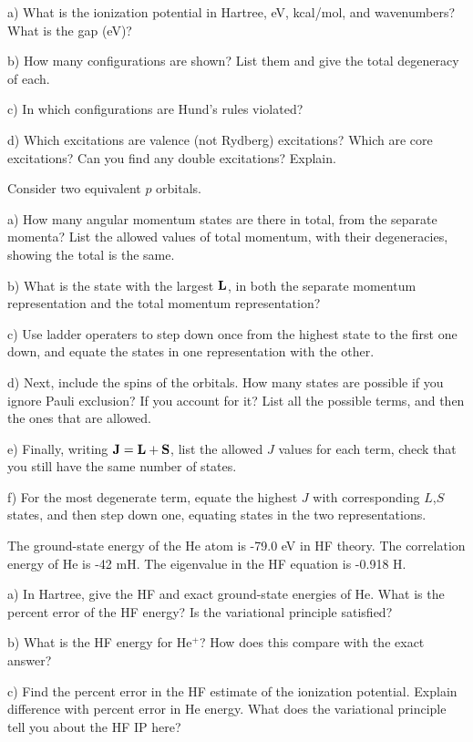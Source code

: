 a) What is the ionization potential in Hartree, eV, kcal/mol, and wavenumbers?
What is the gap (eV)?

b) How many configurations are shown?  List them and give the total degeneracy of each.

c) In which configurations are Hund's rules violated?

d) Which excitations are valence (not Rydberg) excitations?  Which are core excitations?
Can you find any double excitations?  Explain.

\newpage
{}

Consider two equivalent $p$ orbitals.

a) How many angular momentum states are there in total, from the separate
momenta?  List the allowed
values of total momentum, with their degeneracies, showing the total is the same.

b) What is the state with the largest ${\bf L}$, in both the separate momentum representation
and the total momentum representation?

c) Use ladder operaters to step down once from the highest state to the first one down,
and equate the states in one representation with the other.

d) Next, include the spins of the orbitals.   How many states are possible if you
ignore Pauli exclusion?  If you account for it?  List all the possible terms, and
then the ones that are allowed.

\def\bJ{{\bf J}}
\def\bS{{\bf S}}
e) Finally, writing $\bJ=\bL+\bS$, list the allowed $J$ values for each term, check that you still
have the same number of states.

f) For the most degenerate term, equate the highest $J$ with corresponding $L$,$S$ states, and then step down one,
equating states in the two representations.
\newpage
{}

The ground-state energy of the He atom is -79.0 eV in HF theory.  The
correlation energy of He is -42 mH.  The eigenvalue in the HF equation
is -0.918 H.

a) In Hartree, give the HF and exact ground-state energies of He.  What
is the percent error of the HF energy?  Is the variational principle satisfied?

b) What is the HF energy for He$^+$?  How does this compare with the exact answer?

c) Find the percent error in the HF estimate of the ionization potential.  Explain
difference with percent error in He energy.   What does the variational principle
tell you about the HF IP here?

